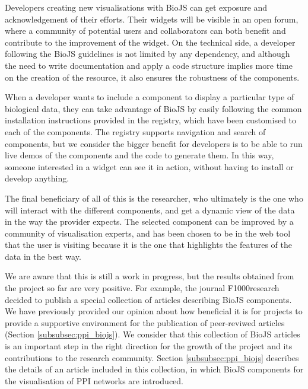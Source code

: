 Developers creating new visualisations with BioJS can get exposure and acknowledgement of their efforts. Their widgets will be visible in an open forum, where a community of potential users and collaborators can both benefit and contribute to the improvement of the widget. On the technical side, a developer following the BioJS guidelines is not limited by any dependency, and although the need to write documentation and apply a code structure implies more time on the creation of the resource, it also ensures the robustness of the components.

When a developer wants to include a component to display a particular type of biological data, they can take advantage of BioJS by easily following the common installation instructions provided in the registry, which have been customised to each of the components. The registry supports navigation and search of components, but we consider the bigger benefit for developers is to be able to run live demos of the components and the code to generate them. In this way, someone interested in a widget can see it in action, without having to install or develop anything.

The final beneficiary of all of this is the researcher, who ultimately is the one who will interact with the different components, and get a dynamic view of the data in the way the provider expects.  The selected component can be improved by a community of visualisation experts, and has been chosen to be in the web tool that the user is visiting because it is the one that highlights the features of the data in the best way.

We are aware that this is still a work in progress, but the results obtained from the project so far are very positive. For example, the journal F1000research decided to publish a special collection of articles describing BioJS components. We have previously provided our opinion about how beneficial it is for projects to provide a supportive environment for the publication of peer-reviwed articles (Section \ref{subsubsec:ppi_biojs}). We consider that this collection of BioJS articles is an important step in the right direction for the growth of the project and its contributions to the research community. Section \ref{subsubsec:ppi_biojs} describes the details of an article included in this collection, in which BioJS components for the visualisation of PPI networks are introduced.

